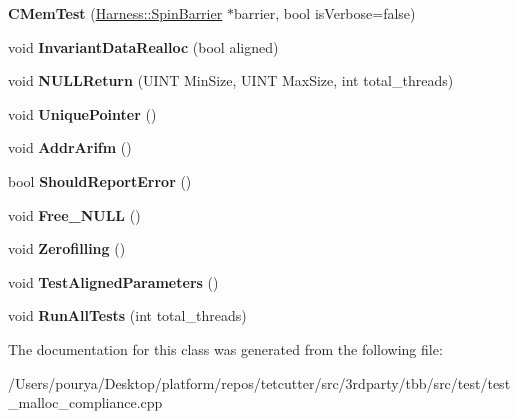 \begin{DoxyCompactItemize}
\item 
\hypertarget{classCMemTest_a4b90303f61e6c49b149b4868c0766e49}{}{\bfseries C\+Mem\+Test} (\hyperlink{classHarness_1_1SpinBarrier}{Harness\+::\+Spin\+Barrier} $\ast$barrier, bool is\+Verbose=false)\label{classCMemTest_a4b90303f61e6c49b149b4868c0766e49}

\item 
\hypertarget{classCMemTest_aa9c0fea457640234a61edb8f25ca1366}{}void {\bfseries Invariant\+Data\+Realloc} (bool aligned)\label{classCMemTest_aa9c0fea457640234a61edb8f25ca1366}

\item 
\hypertarget{classCMemTest_a7a46d6c673ea53e44f4b8b4c499cc4cf}{}void {\bfseries N\+U\+L\+L\+Return} (U\+I\+N\+T Min\+Size, U\+I\+N\+T Max\+Size, int total\+\_\+threads)\label{classCMemTest_a7a46d6c673ea53e44f4b8b4c499cc4cf}

\item 
\hypertarget{classCMemTest_ae18496bd8cf57a6e9546f968a97f6df8}{}void {\bfseries Unique\+Pointer} ()\label{classCMemTest_ae18496bd8cf57a6e9546f968a97f6df8}

\item 
\hypertarget{classCMemTest_a9b29c2a0e68cc26adaceffdffb399a60}{}void {\bfseries Addr\+Arifm} ()\label{classCMemTest_a9b29c2a0e68cc26adaceffdffb399a60}

\item 
\hypertarget{classCMemTest_acbce474e4164b455f4e2e73e5342e723}{}bool {\bfseries Should\+Report\+Error} ()\label{classCMemTest_acbce474e4164b455f4e2e73e5342e723}

\item 
\hypertarget{classCMemTest_a86ce104070d4f71db639f1721df4c4a7}{}void {\bfseries Free\+\_\+\+N\+U\+L\+L} ()\label{classCMemTest_a86ce104070d4f71db639f1721df4c4a7}

\item 
\hypertarget{classCMemTest_a7f5d80cbfd252c6484b3ffbfea907180}{}void {\bfseries Zerofilling} ()\label{classCMemTest_a7f5d80cbfd252c6484b3ffbfea907180}

\item 
\hypertarget{classCMemTest_ae4ed67e6f8b5672c53ffe4fcfefceba1}{}void {\bfseries Test\+Aligned\+Parameters} ()\label{classCMemTest_ae4ed67e6f8b5672c53ffe4fcfefceba1}

\item 
\hypertarget{classCMemTest_aa9e25f8258e9d6df99881ddd542b5f88}{}void {\bfseries Run\+All\+Tests} (int total\+\_\+threads)\label{classCMemTest_aa9e25f8258e9d6df99881ddd542b5f88}

\end{DoxyCompactItemize}


The documentation for this class was generated from the following file\+:\begin{DoxyCompactItemize}
\item 
/\+Users/pourya/\+Desktop/platform/repos/tetcutter/src/3rdparty/tbb/src/test/test\+\_\+malloc\+\_\+compliance.\+cpp\end{DoxyCompactItemize}
